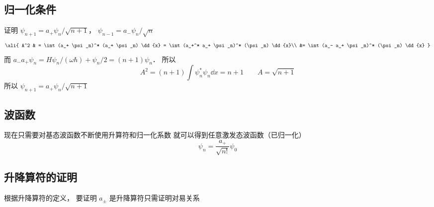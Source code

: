 \subsection{归一化条件}\label{QSHOop_sub1}

证明 $\psi_{n+1} = a_+\psi_n/\sqrt{n+1}$，  $\psi_{n-1} = a_- \psi_n/\sqrt n$ 
\begin{equation}\ali{
A^2 & = \int (a_+ \psi_n)^* (a_+ \psi_n) \dd{x}
= \int (a_+^* a_+ \psi_n)^* (\psi_n) \dd{x}\\
&= \int (a_- a_+ \psi_n)^* (\psi_n) \dd{x}
}\end{equation}
而 $a_- a_+ \psi_n = H\psi_n/(\omega\hbar) + \psi_n/2 = (n + 1)\psi_n$． 所以
\begin{equation}
A^2 = (n + 1)\int \psi_n^*{\psi_n} \dd{x}  = n + 1\qquad
A = \sqrt{n+1}
\end{equation}
所以 $\psi_{n+1} = a_+ \psi_n/\sqrt{n+1}$

\subsection{波函数}
现在只需要对基态波函数不断使用升算符和归一化系数%
就可以得到任意激发态波函数（已归一化）
\begin{equation}
\psi_n = \frac{a_+}{\sqrt {n!}} \psi_0
\end{equation}

\subsection{升降算符的证明}

根据升降算符的定义， 要证明 $a_\pm$ 是升降算符只需证明对易关系

